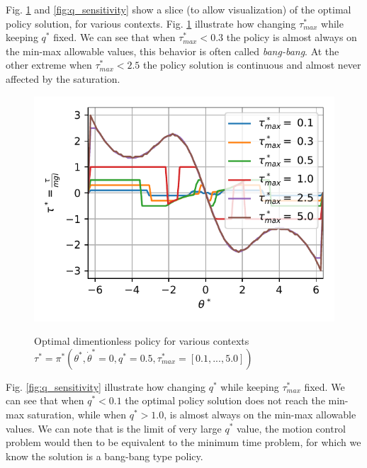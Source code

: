 Fig. \ref{fig:torque_sensitivity} and \ref{fig:q_sensitivity} show a slice (to allow visualization) of the optimal policy solution, for various contexts. Fig. \ref{fig:torque_sensitivity} illustrate how changing $\tau_{max}^*$ while keeping $q^*$ fixed. We can see that when $\tau_{max}^*<0.3$ the policy is almost always on the min-max allowable values, this behavior is often called \textit{bang-bang}. At the other extreme when 
$\tau_{max}^*<2.5$ the policy solution is continuous and almost never affected by the saturation. 
\begin{figure}[ht]
\begin{center}
\includegraphics[width=0.99\linewidth]{fig/qs05.pdf}
\caption{Optimal dimentionless policy for various contexts $\tau^* = \pi^*( \theta^* , \dot{\theta}^* = 0 , q^* = 0.5 , \tau^*_{max} = [0.1, ... , 5.0] )$}
\vspace{-10pt}
\label{fig:torque_sensitivity}
\end{center}
\end{figure}
Fig. \ref{fig:q_sensitivity} illustrate how changing $q^*$ while keeping $\tau_{max}^*$ fixed. We can see that when $q^*<0.1$ the optimal policy solution does not reach the min-max saturation, while when $q^*>1.0$, is almost always on the min-max allowable values. We can note that is the limit of very large $q^*$ value, the motion control problem would then to be equivalent to the minimum time problem, for which we know the solution is a bang-bang type policy.
